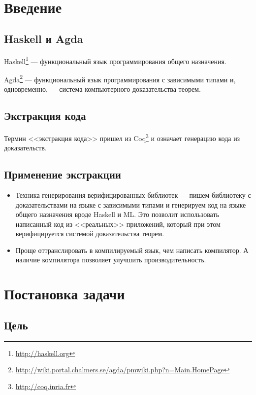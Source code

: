 \section{Введение}

\subsection{Haskell и Agda}

Haskell\footnote{\url{http://haskell.org}} --- функциональный язык программирования
общего назначения.

Agda\footnote{\url{http://wiki.portal.chalmers.se/agda/pmwiki.php?n=Main.HomePage}} ---
функциональный язык программирования с зависимыми типами и, одновременно, ---
система компьютерного доказательства теорем.

\subsection{Экстракция кода}

Термин <<экстракция кода>> пришел из Coq\footnote{\url{http://coq.inria.fr}}
и означает генерацию кода из доказательств\cite{Let02}.

\subsection{Применение экстракции}

\begin{itemize}
\item Техника генерирования верифицированных библиотек --- пишем
      библиотеку с доказательствами на языке с зависимыми типами
      и генерируем код на языке общего назначения вроде Haskell и ML.
      Это позволит использовать написанный код из <<реальных>> приложений,
      который при этом верифицируется системой доказательства теорем.
\item Проще оттранслировать в компилируемый язык, чем написать компилятор.
      А наличие компилятора позволяет улучшить производительность.
\end{itemize}

\newpage
\section{Постановка задачи}

\subsection{Цель}


